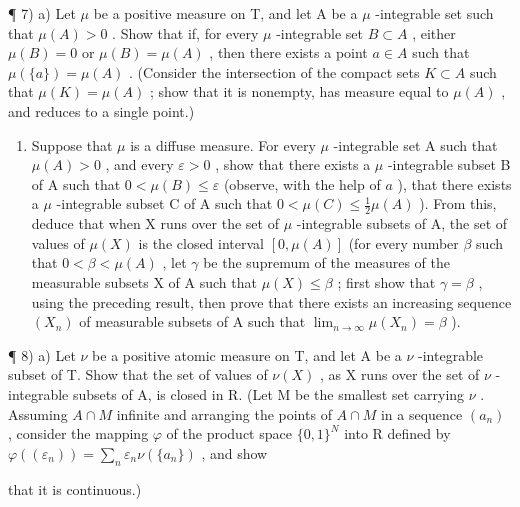 ¶ 7) a) Let \(\mu\) be a positive measure on T, and let A be a \(\mu\) -integrable set such that \(\mu(A) > 0\) . Show that if, for every \(\mu\) -integrable set \(B \subset A\) , either \(\mu(B) = 0\) or \(\mu(B) = \mu(A)\) , then there exists a point \(a \in A\) such that \(\mu(\{a\}) = \mu(A)\) . (Consider the intersection of the compact sets \(K \subset A\) such that \(\mu(K) = \mu(A)\) ; show that it is nonempty, has measure equal to \(\mu(A)\) , and reduces to a single point.)

\begin{enumerate}
\def\labelenumi{\alph{enumi})}
\setcounter{enumi}{1}
\tightlist
\item
  Suppose that \(\mu\) is a diffuse measure. For every \(\mu\) -integrable set A such that \(\mu(A) > 0\) , and every \(\varepsilon > 0\) , show that there exists a \(\mu\) -integrable subset B of A such that \(0 < \mu(B) \leqslant \varepsilon\) (observe, with the help of \(a\) ), that there exists a \(\mu\) -integrable subset C of A such that \(0 < \mu(C) \leqslant \frac{1}{2} \mu(A)\) ). From this, deduce that when X runs over the set of \(\mu\) -integrable subsets of A, the set of values of \(\mu(X)\) is the closed interval \([0, \mu(A)]\) (for every number \(\beta\) such that \(0 < \beta < \mu(A)\) , let \(\gamma\) be the supremum of the measures of the measurable subsets X of A such that \(\mu(X) \leqslant \beta\) ; first show that \(\gamma = \beta\) , using the preceding result, then prove that there exists an increasing sequence \((X_n)\) of measurable subsets of A such that \(\lim_{n \to \infty} \mu(X_n) = \beta\) ).
\end{enumerate}

¶ 8) a) Let \(\nu\) be a positive atomic measure on T, and let A be a \(\nu\) -integrable subset of T. Show that the set of values of \(\nu(X)\) , as X runs over the set of \(\nu\) -integrable subsets of A, is closed in R. (Let M be the smallest set carrying \(\nu\) . Assuming \(A \cap M\) infinite and arranging the points of \(A \cap M\) in a sequence \((a_n)\) , consider the mapping \(\varphi\) of the product space \(\{0,1\}^N\) into R defined by \(\varphi((\varepsilon_n)) = \sum_n \varepsilon_n \nu(\{a_n\})\) , and show

that it is continuous.)

